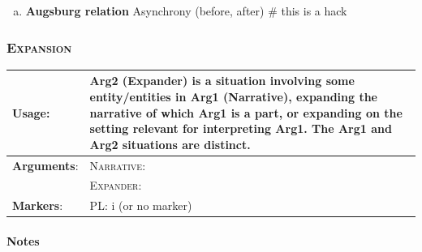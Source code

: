 \documentclass{udisc}
\begin{document}
\begin{enumerate}[a)]
\item \textbf{Augsburg relation} Asynchrony (before, after)
\nonstopmode # this is a hack
\end{enumerate}
\errorstopmode



\subsubsection{\textsc{Expansion}}

\begin{tabularx}{\textwidth}{|l|L|}
\hline

\textbf{Usage}:           &  Arg2 (Expander) is a situation involving some entity/entities in Arg1 (Narrative), expanding the narrative of which Arg1 is a part, or expanding on the setting relevant for interpreting Arg1. The Arg1 and Arg2 situations are distinct. \\
\hline

\textbf{Arguments}:       &  \textsc{Narrative}: \\
                          &  \textsc{Expander}: \\
\hline

\textbf{Markers}:        &  PL: i (or no marker) \\
\hline

\end{tabularx}

\paragraph{Notes} 
\end{document}

